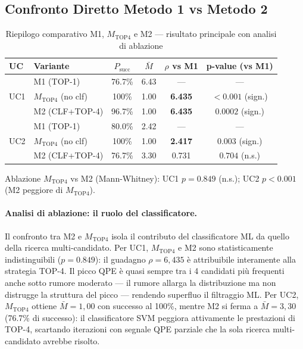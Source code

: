 \begin{onehalfspace}
\section{Confronto Diretto Metodo 1 vs Metodo 2}
\label{sec:confronto}

\begin{table}[H]
\centering
\caption{Riepilogo comparativo M1, $M_{\text{TOP4}}$ e M2 --- risultato principale con analisi di ablazione}
\label{tab:riepilogo_rho}
\begin{tabular}{llcccc}
\hline
\textbf{UC} & \textbf{Variante} & \textbf{$P_{\text{succ}}$} & \textbf{$\bar{M}$} & \textbf{$\rho$ vs M1} & \textbf{p-value (vs M1)} \\
\hline
\multirow{3}{*}{UC1} & M1 (TOP-1)                 & 76.7\% & 6.43 & ---            & --- \\
                     & $M_{\text{TOP4}}$ (no clf) & 100\%  & 1.00 & \textbf{6.435} & ${<}0.001$ (sign.) \\
                     & M2 (CLF+TOP-4)             & 96.7\% & 1.00 & \textbf{6.435} & $0.0002$ (sign.) \\
\hline
\multirow{3}{*}{UC2} & M1 (TOP-1)                 & 80.0\% & 2.42 & ---            & --- \\
                     & $M_{\text{TOP4}}$ (no clf) & 100\%  & 1.00 & \textbf{2.417} & $0.003$ (sign.) \\
                     & M2 (CLF+TOP-4)             & 76.7\% & 3.30 & 0.731          & $0.704$ (n.s.) \\
\hline
\end{tabular}

\smallskip
{\footnotesize Ablazione $M_{\text{TOP4}}$ vs M2 (Mann-Whitney): UC1 $p = 0.849$ (n.s.); UC2 $p < 0.001$ (M2 peggiore di $M_{\text{TOP4}}$).}
\end{table}

\paragraph{Analisi di ablazione: il ruolo del classificatore.}
Il confronto tra M2 e $M_{\text{TOP4}}$ isola il contributo del classificatore ML da quello della ricerca multi-candidato. Per UC1, $M_{\text{TOP4}}$ e M2 sono statisticamente indistinguibili ($p = 0.849$): il guadagno $\rho = 6{,}435$ è attribuibile interamente alla strategia TOP-4. Il picco QPE è quasi sempre tra i 4 candidati più frequenti anche sotto rumore moderato --- il rumore allarga la distribuzione ma non distrugge la struttura del picco --- rendendo superfluo il filtraggio ML. Per UC2, $M_{\text{TOP4}}$ ottiene $\bar{M} = 1{,}00$ con successo al 100\%, mentre M2 si ferma a $\bar{M} = 3{,}30$ (76.7\% di successo): il classificatore \ac{SVM} peggiora attivamente le prestazioni di TOP-4, scartando iterazioni con segnale QPE parziale che la sola ricerca multi-candidato avrebbe risolto.


\end{onehalfspace}
